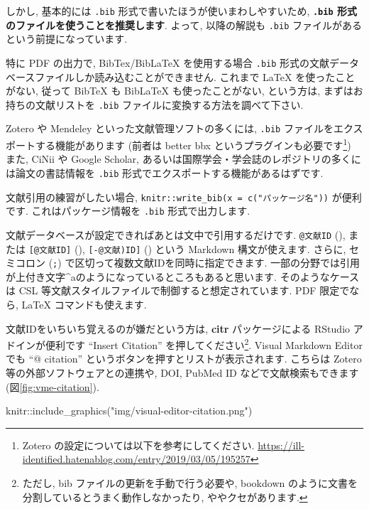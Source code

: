 \documentclass[
]{ltjsarticle}
\newenvironment{Shaded}{\begin{snugshade}}{\end{snugshade}}
\newcommand{\FunctionTok}[1]{\textcolor[rgb]{0.00,0.00,0.00}{#1}}
\newcommand{\NormalTok}[1]{#1}
\newcommand{\SpecialCharTok}[1]{\textcolor[rgb]{0.00,0.00,0.00}{#1}}
\newcommand{\StringTok}[1]{\textcolor[rgb]{0.31,0.60,0.02}{#1}}
\begin{document}
しかし, 基本的には \texttt{.bib} 形式で書いたほうが使いまわしやすいため, \textbf{\texttt{.bib} 形式のファイルを使うことを推奨します}. よって, 以降の解説も \texttt{.bib} ファイルがあるという前提になっています.

特に PDF の出力で, BibTex/BibLaTeX を使用する場合 \texttt{.bib} 形式の文献データベースファイルしか読み込むことができません. これまで LaTeX を使ったことがない, 従って BibTeX も BibLaTeX も使ったことがない, という方は, まずはお持ちの文献リストを \texttt{.bib} ファイルに変換する方法を調べて下さい.

Zotero や Mendeley といった文献管理ソフトの多くには, \texttt{.bib} ファイルをエクスポートする機能があります (前者は better bbx というプラグインも必要です\footnote{Zotero の設定については以下を参考にしてください. \url{https://ill-identified.hatenablog.com/entry/2019/03/05/195257}}) また, CiNii や Google Scholar, あるいは国際学会・学会誌のレポジトリの多くには論文の書誌情報を \texttt{.bib} 形式でエクスポートする機能があるはずです.

文献引用の練習がしたい場合, \texttt{knitr::write\_bib(x\ =\ c("パッケージ名"))} が便利です. これはパッケージ情報を \texttt{.bib} 形式で出力します.

文献データベースが設定できればあとは文中で引用するだけです. \texttt{@文献ID} (\citet{R-rmarkdown}), または \texttt{{[}@文献ID{]}} (\citep{R-bookdown}), \texttt{{[}-@文献)ID{]}} (\citeyearpar{R-citr}) という Markdown 構文が使えます. さらに, セミコロン (\texttt{;}) で区切って複数文献IDを同時に指定できます. 一部の分野では引用が上付き文字\^{}aのようになっているところもあると思います. そのようなケースは CSL 等文献スタイルファイルで制御すると想定されています. PDF 限定でなら, LaTeX コマンドも使えます.

文献IDをいちいち覚えるのが嫌だという方は, \textbf{citr} パッケージによる RStudio アドインが便利です ``Insert Citation'' を押してください\footnote{ただし, bib ファイルの更新を手動で行う必要や, bookdown のように文書を分割しているとうまく動作しなかったり, ややクセがあります.}. Visual Markdown Editor でも ``@ citation'' というボタンを押すとリストが表示されます. こちらは Zotero 等の外部ソフトウェアとの連携や, DOI, PubMed ID などで文献検索もできます (図\ref{fig:vme-citation}).

\begin{Shaded}
\begin{Highlighting}[numbers=left,,]
\NormalTok{knitr}\SpecialCharTok{::}\FunctionTok{include\_graphics}\NormalTok{(}\StringTok{"img/visual{-}editor{-}citation.png"}\NormalTok{)}
\end{Highlighting}
\end{Shaded}
\end{document}
